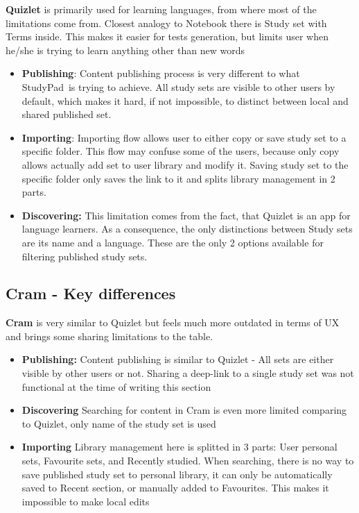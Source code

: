 \documentclass[thesis=B,english]{FITthesis}[2012/10/20]
\newcommand{\appname}{StudyPad}
\begin{document}
\textbf{Quizlet} is primarily used for learning languages, from where most of the limitations come from. Closest analogy to Notebook there is Study set with Terms inside. This makes it easier for tests generation, but limits user when he/she is trying to learn anything other than new words



\begin{itemize}
	\item \textbf{Publishing}: Content publishing process is very different to what \appname\ is trying to achieve. All study sets are visible to other users by default, which makes it hard, if not impossible, to distinct between local and shared published set.
	\item \textbf{Importing}: Importing flow allows user to either copy or save study set to a specific folder. This flow may confuse some of the users, because only copy allows actually add set to user library and modify it. Saving study set to the specific folder only saves the link to it and splits library management in 2 parts.
	\item \textbf{Discovering:} This limitation comes from the fact, that Quizlet is an app for language learners. As a consequence, the only distinctions between Study sets are its name and a language. These are the only 2 options available for filtering published study sets.

\end{itemize}

\subsection{Cram - Key differences}
\textbf{Cram} is very similar to Quizlet but feels much more outdated in terms of UX and brings some sharing limitations to the table.

\begin{itemize}
	\item  \textbf{Publishing:} Content publishing is similar to Quizlet - All sets are either visible by other users or not. Sharing a deep-link to a single study set was not functional at the time of writing this section
	\item \textbf{Discovering} Searching for content in Cram is even more limited comparing to Quizlet, only name of the study set is used
	\item \textbf{Importing} Library management here is splitted in 3 parts: User personal sets, Favourite sets, and Recently studied. When searching, there is no way to save published study set to personal library, it can only be automatically saved to Recent section, or manually added to Favourites. This makes it impossible to make local edits
\end{itemize}
\end{document}
